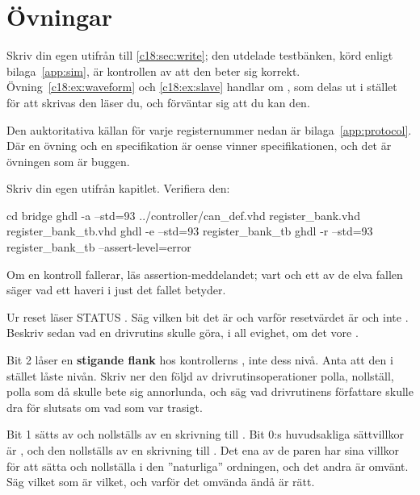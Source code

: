 
\section{Övningar}
\label{c18:sec:exercises}

\begin{aside}
Skriv din egen  utifrån  till \ref{c18:sec:write}; den
utdelade testbänken, körd enligt bilaga~\ref{app:sim}, är kontrollen av att den beter sig korrekt.
Övning~\ref{c18:ex:waveform} och \ref{c18:ex:slave} handlar om , som delas ut i
stället för att skrivas \textemdash{} den läser du, och  förväntar sig att du kan
den.

Den auktoritativa källan för varje registernummer nedan är bilaga~\ref{app:protocol}. Där en övning
och en specifikation är oense vinner specifikationen, och det är övningen som är buggen.
\end{aside}

\label{c18:ex:bank}
Skriv din egen  utifrån kapitlet. Verifiera den:

\begin{shell}
cd bridge
ghdl -a --std=93 ../controller/can_def.vhd register_bank.vhd register_bank_tb.vhd
ghdl -e --std=93 register_bank_tb
ghdl -r --std=93 register_bank_tb --assert-level=error
\end{shell}

Om en kontroll fallerar, läs assertion-meddelandet; vart och ett av de elva fallen säger vad ett
haveri i just det fallet betyder.

\label{c18:ex:status}
 Ur reset läser STATUS . Säg vilken bit det är och varför resetvärdet är
 och inte . Beskriv sedan vad en drivrutins  skulle göra, i all
evighet, om det vore .

 Bit 2 låser en \textbf{stigande flank} hos kontrollerns , inte dess nivå. Anta
att den i stället låste nivån. Skriv ner den följd av drivrutinsoperationer \textemdash{} polla,
nollställ, polla \textemdash{} som då skulle bete sig annorlunda, och säg vad drivrutinens författare
skulle dra för slutsats om vad som var trasigt.

 Bit 1 sätts av  och nollställs av en skrivning till . Bit 0:s
huvudsakliga sättvillkor är , och den nollställs av en skrivning till .
Det ena av de paren har sina villkor för att sätta och nollställa i den ”naturliga” ordningen, och
det andra är omvänt. Säg vilket som är vilket, och varför det omvända ändå är rätt.


